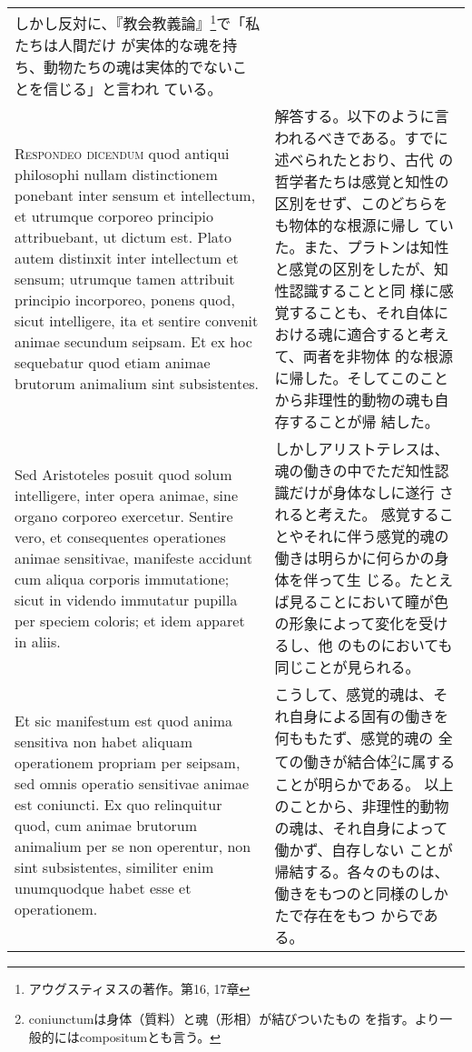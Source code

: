 \documentclass[10pt]{jsarticle} %
\begin{document}
\begin{longtable}{p{21em}p{21em}}
しかし反対に、『教会教義論』\footnote{アウグスティヌスの著作。第16, 17章}で「私たちは人間だけ
 が実体的な魂を持ち、動物たちの魂は実体的でないことを信じる」と言われ
 ている。


\\



{\scshape Respondeo dicendum} quod antiqui philosophi nullam distinctionem
ponebant inter sensum et intellectum, et utrumque corporeo principio
attribuebant, ut dictum est. Plato autem distinxit inter intellectum
et sensum; utrumque tamen attribuit principio incorporeo, ponens quod,
sicut intelligere, ita et sentire convenit animae secundum seipsam. Et
ex hoc sequebatur quod etiam animae brutorum animalium sint
subsistentes. 


&

解答する。以下のように言われるべきである。すでに述べられたとおり、古代
の哲学者たちは感覚と知性の区別をせず、このどちらをも物体的な根源に帰し
ていた。また、プラトンは知性と感覚の区別をしたが、知性認識することと同
様に感覚することも、それ自体における魂に適合すると考えて、両者を非物体
的な根源に帰した。そしてこのことから非理性的動物の魂も自存することが帰
結した。

\\



Sed Aristoteles posuit quod solum intelligere, inter
opera animae, sine organo corporeo exercetur. Sentire vero, et
consequentes operationes animae sensitivae, manifeste accidunt cum
aliqua corporis immutatione; sicut in videndo immutatur pupilla per
speciem coloris; et idem apparet in aliis. 


&

しかしアリストテレスは、魂の働きの中でただ知性認識だけが身体なしに遂行
 されると考えた。
感覚することやそれに伴う感覚的魂の働きは明らかに何らかの身体を伴って生
 じる。たとえば見ることにおいて瞳が色の形象によって変化を受けるし、他
 のものにおいても同じことが見られる。

\\


Et sic manifestum est quod
anima sensitiva non habet aliquam operationem propriam per seipsam,
sed omnis operatio sensitivae animae est coniuncti. Ex quo relinquitur
quod, cum animae brutorum animalium per se non operentur, non sint
subsistentes, similiter enim unumquodque habet esse et operationem.

&

こうして、感覚的魂は、それ自身による固有の働きを何ももたず、感覚的魂の
 全ての働きが結合体\footnote{coniunctumは身体（質料）と魂（形相）が結びついたもの
 を指す。より一般的にはcompositumとも言う。}に属することが明らかである。
以上のことから、非理性的動物の魂は、それ自身によって働かず、自存しない
 ことが帰結する。各々のものは、働きをもつのと同様のしかたで存在をもつ
 からである。


\end{longtable}
\end{document}
